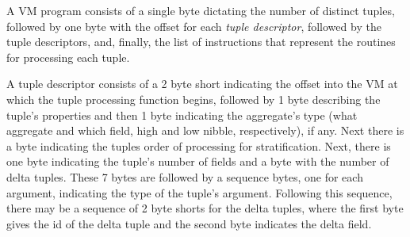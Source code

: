 \documentclass{article}
\begin{document}
\newcommand{\inst}[3]{#1&\byte#2\\\endbyte&{\it #3}\\}
\newcommand{\op}[2]{\ensuremath{#1}&\byte#2\\\endbyte\\}
\newcommand{\val}[3]{#1&\byte#2\\\endbyte&{\it #3}\\}


A VM program consists of a single byte dictating the number of distinct tuples,
followed by one byte with the offset for each \emph{tuple descriptor}, followed by
the tuple descriptors, and, finally, the list of instructions that represent the
routines for processing each tuple.

A tuple descriptor consists of a 2 byte short indicating the offset into the
VM at which the tuple processing function begins, followed by 1 byte describing the tuple's properties and then
1 byte indicating the aggregate's type (what aggregate and which field, high and low nibble,
respectively), if any. Next there is a byte indicating the tuples order
of processing for stratification.
Next, there is one byte indicating the tuple's number of fields and a byte with the number of delta tuples.
These 7 bytes are followed by a sequence bytes, one for each argument, indicating the type of the tuple's
argument. Following this sequence, there may be
a sequence of 2 byte shorts for the delta tuples, where the first byte gives the id of the
delta tuple and the second byte indicates the delta field.
\end{document}
